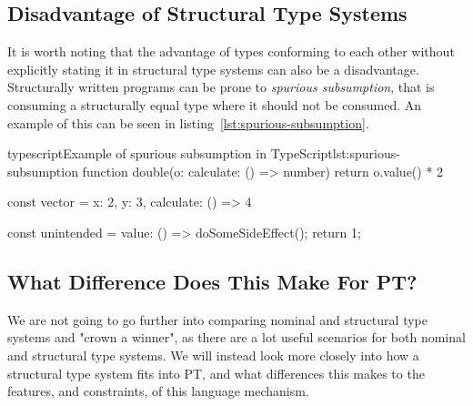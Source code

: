 \subsection{Disadvantage of Structural Type Systems}\label{subsec:disadvantage-of-structural-type-systems}

It is worth noting that the advantage of types conforming to each other without explicitly stating it in structural type systems can also be a disadvantage.
Structurally written programs can be prone to \textit{spurious subsumption}, that is consuming a structurally equal type where it should not be consumed.
An example of this can be seen in listing~\vref{lst:spurious-subsumption}.

\begin{code}{typescript}{Example of spurious subsumption in TypeScript}{lst:spurious-subsumption}
    function double(o: {calculate: () => number}) {
        return o.value() * 2
    }

    const vector = {
        x: 2,
        y: 3,
        calculate: () => 4
    }

    const unintended = {
        value: () => {
            doSomeSideEffect();
            return 1;
        }
    }
\end{code}

\subsection{What Difference Does This Make For PT?}\label{subsec:what-difference-does-this-make-for-pt?}

We are not going to go further into comparing nominal and structural type systems and "crown a winner", as there are a lot useful scenarios for both nominal and structural type systems.
We will instead look more closely into how a structural type system fits into PT, and what differences this makes to the features, and constraints, of this language mechanism.


%
%
%
%
%




